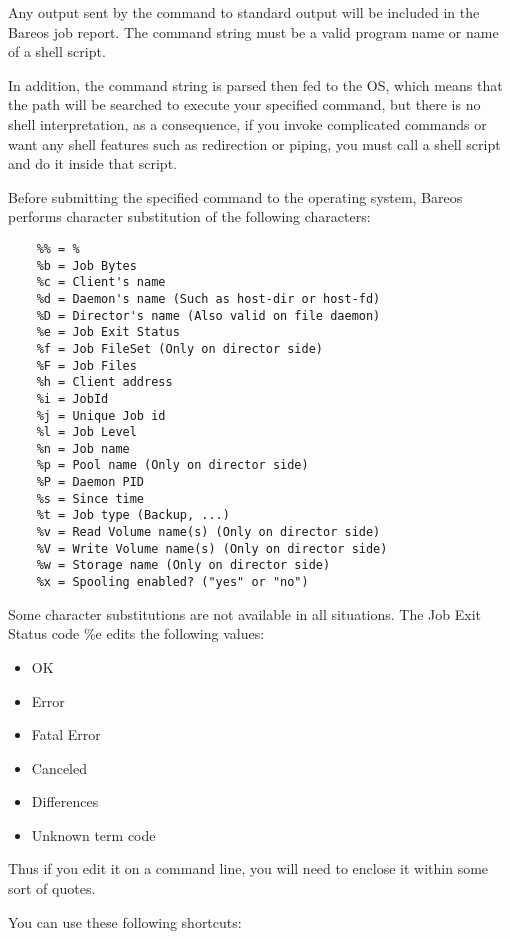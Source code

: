 \begin{description}
Any output sent by the command to standard output will be included in the
Bareos job report.  The command string must be a valid program name or name
of a shell script.

In addition, the command string is parsed then fed to the OS,
which means that the path will be searched to execute your specified
command, but there is no shell interpretation, as a consequence, if you
invoke complicated commands or want any shell features such as redirection
or piping, you must call a shell script and do it inside that script.

Before submitting the specified command to the operating system, Bareos
performs character substitution of the following characters:

\label{character substitution}
\footnotesize
\begin{verbatim}
    %% = %
    %b = Job Bytes
    %c = Client's name
    %d = Daemon's name (Such as host-dir or host-fd)
    %D = Director's name (Also valid on file daemon)
    %e = Job Exit Status
    %f = Job FileSet (Only on director side)
    %F = Job Files
    %h = Client address
    %i = JobId
    %j = Unique Job id
    %l = Job Level
    %n = Job name
    %p = Pool name (Only on director side)
    %P = Daemon PID
    %s = Since time
    %t = Job type (Backup, ...)
    %v = Read Volume name(s) (Only on director side)
    %V = Write Volume name(s) (Only on director side)
    %w = Storage name (Only on director side)
    %x = Spooling enabled? ("yes" or "no")
\end{verbatim}
\normalsize

Some character substitutions are not available in all situations. The Job Exit
Status code \%e edits the following values:

\begin{itemize}
\item OK
\item Error
\item Fatal Error
\item Canceled
\item Differences
\item Unknown term code
\end{itemize}

   Thus if you edit it on a command line, you will need to enclose
   it within some sort of quotes.


You can use these following shortcuts:\\


\end{description}
